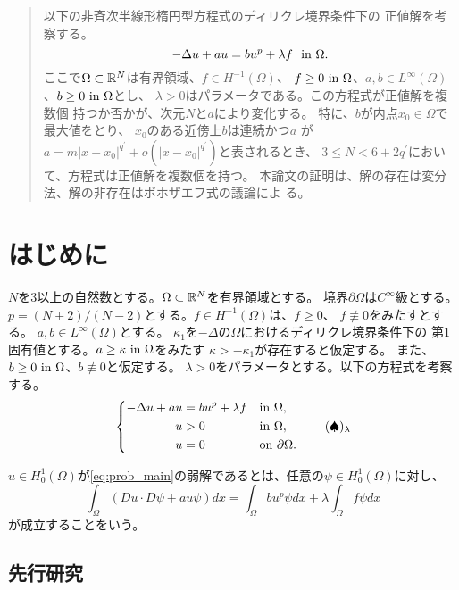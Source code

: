 \begin{abstract}
 以下の非斉次半線形楕円型方程式のディリクレ境界条件下の
 正値解を考察する。
 \[
  -\Delta u + a u = b u^p + \lambda f \ \ \text{in}~ \Omega.
 \]
 ここで$\Omega \subset \mathbb{R}^N$は有界領域、$f \in H^{-1}(\Omega)$、
 $f \geq 0 ~\text{in}~ \Omega$、$a, b \in L^\infty(\Omega)$、$b \geq 0 ~\text{in}~
 \Omega$とし、
 $\lambda > 0$はパラメータである。この方程式が正値解を複数個
 持つか否かが、次元$N$と$a$により変化する。
 特に、$b$が内点$x_0 \in \Omega$で最大値をとり、
 $x_0$のある近傍上$b$は連続かつ$a$
 が$a = m \lvert x - x_0 \rvert^{q^\prime} + o( \lvert x - x_0
 \rvert^{q^\prime})$と表されるとき、
 $3 \leq N < 6 + 2q^\prime$において、方程式は正値解を複数個を持つ。
 本論文の証明は、解の存在は変分法、解の非存在はポホザエフ式の議論によ
 る。
\end{abstract}

\section{はじめに}

$N$を$3$以上の自然数とする。$\Omega \subset \mathbb{R}^N$を有界領域とする。
境界$\partial \Omega$は$C^\infty$級とする。
$p = (N+2)/(N-2)$とする。$f \in H^{-1}(\Omega)$は、$f \geq 0$、
$f \not \equiv 0$をみたすとする。
$a, b \in L^\infty(\Omega)$とする。
$\kappa_1$を$-\Delta$の$\Omega$におけるディリクレ境界条件下の
第$1$固有値とする。$a \geq \kappa ~\text{in}~ \Omega$をみたす
$\kappa > - \kappa_1$が存在すると仮定する。
また、$b \geq 0 ~\text{in}~ \Omega$、$b \not \equiv 0$と仮定する。
$\lambda > 0$をパラメータとする。以下の方程式を考察する。
\begin{align}
 \left\{
 \begin{aligned}
  -\Delta u + a u &= b u^p + \lambda f  & &\text{in}~ \Omega,  \\
  u &> 0 & &\text{in}~ \Omega, \\
  u &= 0 & &\text{on}~ \partial\Omega.
 \end{aligned}
 \right. \tag*{$(\spadesuit)_\lambda$} \label{eq:prob_main}
\end{align}

$u \in H_0^1(\Omega)$が\ref{eq:prob_main}の弱解であるとは、任意の$\psi
\in H_0^1(\Omega)$に対し、
\[
 \int_\Omega \left( Du \cdot D\psi + a u \psi \right) dx = \int_\Omega
 b u^p \psi dx + \lambda \int_\Omega f \psi dx
\]
が成立することをいう。

\subsection{先行研究}

